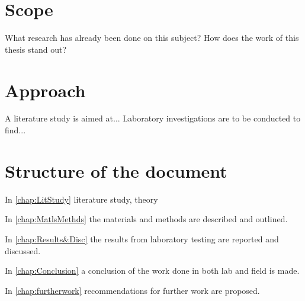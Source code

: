 \section{Scope} 
What research has already been done on this subject? How does the work of this thesis stand out?
\section{Approach}
A literature study is aimed at...
Laboratory investigations are to be conducted to find... 

\section{Structure of the document}
In \cref{chap:LitStudy} literature study, theory

In \cref{chap:MatlsMethds} the materials and methods are described and outlined.

In \cref{chap:Results&Disc} the results from laboratory testing are reported and discussed.

In \cref{chap:Conclusion} a conclusion of the work done in both lab and field is made.

In \cref{chap:furtherwork} recommendations for further work are proposed.